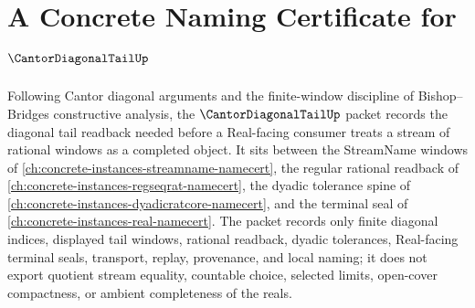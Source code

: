 \chapter{A Concrete Naming Certificate for $\CantorDiagonalTailUp$}
\label{ch:concrete-instances-cantor-diagonal-tail-namecert}

Following Cantor diagonal arguments and the finite-window discipline of Bishop--Bridges constructive analysis, the $\CantorDiagonalTailUp$ packet records the diagonal tail readback needed before a Real-facing consumer treats a stream of rational windows as a completed object. It sits between the StreamName windows of \autoref{ch:concrete-instances-streamname-namecert}, the regular rational readback of \autoref{ch:concrete-instances-regseqrat-namecert}, the dyadic tolerance spine of \autoref{ch:concrete-instances-dyadicratcore-namecert}, and the terminal seal of \autoref{ch:concrete-instances-real-namecert}. The packet records only finite diagonal indices, displayed tail windows, rational readback, dyadic tolerances, Real-facing terminal seals, transport, replay, provenance, and local naming; it does not export quotient stream equality, countable choice, selected limits, open-cover compactness, or ambient completeness of the reals.

